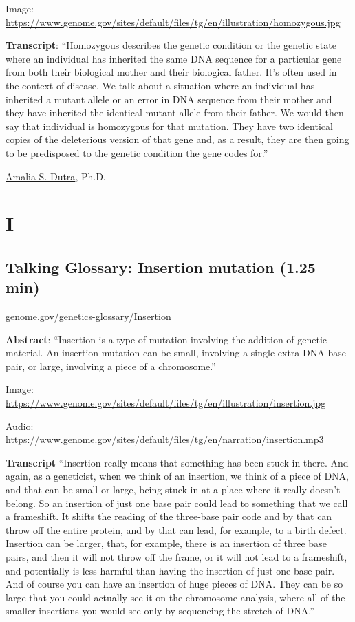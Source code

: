 \documentclass[
]{book}
\begin{document}
Image: \url{https://www.genome.gov/sites/default/files/tg/en/illustration/homozygous.jpg}

\textbf{Transcript}: ``Homozygous describes the genetic condition or the genetic state where an individual has inherited the same DNA sequence for a particular gene from both their biological mother and their biological father. It's often used in the context of disease. We talk about a situation where an individual has inherited a mutant allele or an error in DNA sequence from their mother and they have inherited the identical mutant allele from their father. We would then say that individual is homozygous for that mutation. They have two identical copies of the deleterious version of that gene and, as a result, they are then going to be predisposed to the genetic condition the gene codes for.''

\href{https://en.wikipedia.org/wiki/Amalia_Dutra}{Amalia S. Dutra}, Ph.D.

\hypertarget{i}{%
\chapter{I}\label{i}}

\hypertarget{talking-glossary-insertion-mutation-1.25-min}{%
\section{Talking Glossary: Insertion mutation (1.25 min)}\label{talking-glossary-insertion-mutation-1.25-min}}

genome.gov/genetics-glossary/Insertion

\textbf{Abstract}: ``Insertion is a type of mutation involving the addition of genetic material. An insertion mutation can be small, involving a single extra DNA base pair, or large, involving a piece of a chromosome.''

Image: \url{https://www.genome.gov/sites/default/files/tg/en/illustration/insertion.jpg}

Audio: \url{https://www.genome.gov/sites/default/files/tg/en/narration/insertion.mp3}

\textbf{Transcript} ``Insertion really means that something has been stuck in there. And again, as a geneticist, when we think of an insertion, we think of a piece of DNA, and that can be small or large, being stuck in at a place where it really doesn't belong. So an insertion of just one base pair could lead to something that we call a frameshift. It shifts the reading of the three-base pair code and by that can throw off the entire protein, and by that can lead, for example, to a birth defect. Insertion can be larger, that, for example, there is an insertion of three base pairs, and then it will not throw off the frame, or it will not lead to a frameshift, and potentially is less harmful than having the insertion of just one base pair. And of course you can have an insertion of huge pieces of DNA. They can be so large that you could actually see it on the chromosome analysis, where all of the smaller insertions you would see only by sequencing the stretch of DNA.''
\end{document}
